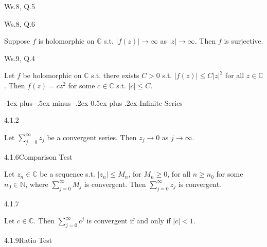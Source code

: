 \documentclass[10pt,landscape]{article}
\makeatletter
\renewcommand{\leq}{\leqslant}
\renewcommand{\section}{\@startsection{section}{1}{0mm}%
                                {-1ex plus -.5ex minus -.2ex}%
                                {0.5ex plus .2ex}%
                                {\normalfont\large\bfseries}}
\makeatother
\begin{document}
\begin{multicols}{3}
\begin{question}{Ws.8, Q.5}{}
\end{question}

\begin{question}{Ws.8, Q.6}{}

    Suppose $f$ is holomorphic on $\mathbb{C}$ s.t. $|f(z)| \to \infty$ as $|z| \to \infty$. Then $f$ is surjective.

\end{question}

\begin{question}{Ws.9, Q.4}{}

    Let $f$ be holomorphic on $\mathbb{C}$ s.t. there exists $C > 0$ s.t. $|f(z)| \leq C|z|^2$ for all $z \in \mathbb{C}$. Then $f(z) = cz^2$ for some $c \in \mathbb{C}$ s.t. $|c| \leq C$.

\end{question}


\section{Infinite Series}

\begin{lemma}{4.1.2}{}

    Let $\sum_{j=0}^{\infty}z_j$ be a convergent series. Then $z_j \to 0$ as $j \to \infty$.

\end{lemma}

\begin{lemma}{4.1.6}{Comparison Test}

    Let $z_n \in \mathbb{C}$ be a sequence s.t. $|z_n| \le M_n$, for $M_n \ge 0$, for all $n \ge n_0$ for some $n_0 \in \mathbb{N}$, where $\sum_{j=0}^{\infty}M_j$ is convergent. Then $\sum_{j=0}^{\infty}z_j$ is convergent.

\end{lemma}

\begin{lemma}{4.1.7}{}

    Let $c \in \mathbb{C}$. Then $\sum_{j=0}^{\infty}c^j$ is convergent if and only if $|c| < 1$.

\end{lemma}

\begin{lemma}{4.1.9}{Ratio Test}


\end{lemma}
\end{multicols}
\end{document}
